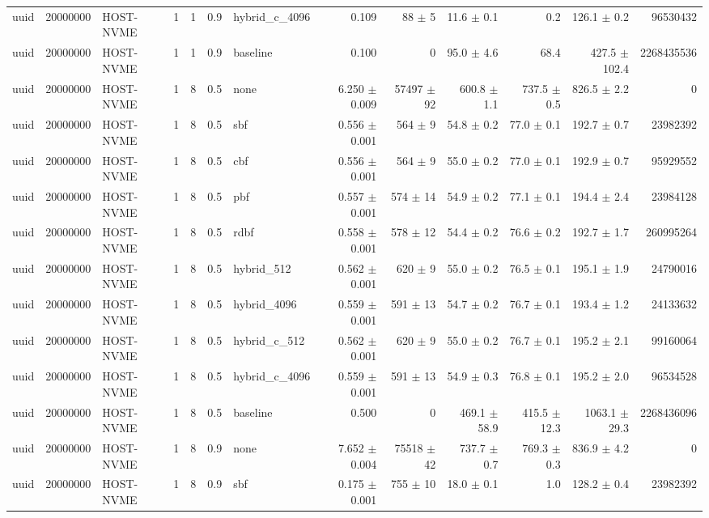 \begin{tabular}{lllllllrrrrrr}
uuid & 20000000 & HOST-NVME & 1 & 1 & 0.9 & hybrid\_c\_4096 & 0.109 & 88 $\pm$ 5 & 11.6 $\pm$ 0.1 & 0.2 & 126.1 $\pm$ 0.2 & 96530432 \\
uuid & 20000000 & HOST-NVME & 1 & 1 & 0.9 & baseline & 0.100 & 0 & 95.0 $\pm$ 4.6 & 68.4 & 427.5 $\pm$ 102.4 & 2268435536 \\
uuid & 20000000 & HOST-NVME & 1 & 8 & 0.5 & none & 6.250 $\pm$ 0.009 & 57497 $\pm$ 92 & 600.8 $\pm$ 1.1 & 737.5 $\pm$ 0.5 & 826.5 $\pm$ 2.2 & 0 \\
uuid & 20000000 & HOST-NVME & 1 & 8 & 0.5 & sbf & 0.556 $\pm$ 0.001 & 564 $\pm$ 9 & 54.8 $\pm$ 0.2 & 77.0 $\pm$ 0.1 & 192.7 $\pm$ 0.7 & 23982392 \\
uuid & 20000000 & HOST-NVME & 1 & 8 & 0.5 & cbf & 0.556 $\pm$ 0.001 & 564 $\pm$ 9 & 55.0 $\pm$ 0.2 & 77.0 $\pm$ 0.1 & 192.9 $\pm$ 0.7 & 95929552 \\
uuid & 20000000 & HOST-NVME & 1 & 8 & 0.5 & pbf & 0.557 $\pm$ 0.001 & 574 $\pm$ 14 & 54.9 $\pm$ 0.2 & 77.1 $\pm$ 0.1 & 194.4 $\pm$ 2.4 & 23984128 \\
uuid & 20000000 & HOST-NVME & 1 & 8 & 0.5 & rdbf & 0.558 $\pm$ 0.001 & 578 $\pm$ 12 & 54.4 $\pm$ 0.2 & 76.6 $\pm$ 0.2 & 192.7 $\pm$ 1.7 & 260995264 \\
uuid & 20000000 & HOST-NVME & 1 & 8 & 0.5 & hybrid\_512 & 0.562 $\pm$ 0.001 & 620 $\pm$ 9 & 55.0 $\pm$ 0.2 & 76.5 $\pm$ 0.1 & 195.1 $\pm$ 1.9 & 24790016 \\
uuid & 20000000 & HOST-NVME & 1 & 8 & 0.5 & hybrid\_4096 & 0.559 $\pm$ 0.001 & 591 $\pm$ 13 & 54.7 $\pm$ 0.2 & 76.7 $\pm$ 0.1 & 193.4 $\pm$ 1.2 & 24133632 \\
uuid & 20000000 & HOST-NVME & 1 & 8 & 0.5 & hybrid\_c\_512 & 0.562 $\pm$ 0.001 & 620 $\pm$ 9 & 55.0 $\pm$ 0.2 & 76.7 $\pm$ 0.1 & 195.2 $\pm$ 2.1 & 99160064 \\
uuid & 20000000 & HOST-NVME & 1 & 8 & 0.5 & hybrid\_c\_4096 & 0.559 $\pm$ 0.001 & 591 $\pm$ 13 & 54.9 $\pm$ 0.3 & 76.8 $\pm$ 0.1 & 195.2 $\pm$ 2.0 & 96534528 \\
uuid & 20000000 & HOST-NVME & 1 & 8 & 0.5 & baseline & 0.500 & 0 & 469.1 $\pm$ 58.9 & 415.5 $\pm$ 12.3 & 1063.1 $\pm$ 29.3 & 2268436096 \\
uuid & 20000000 & HOST-NVME & 1 & 8 & 0.9 & none & 7.652 $\pm$ 0.004 & 75518 $\pm$ 42 & 737.7 $\pm$ 0.7 & 769.3 $\pm$ 0.3 & 836.9 $\pm$ 4.2 & 0 \\
uuid & 20000000 & HOST-NVME & 1 & 8 & 0.9 & sbf & 0.175 $\pm$ 0.001 & 755 $\pm$ 10 & 18.0 $\pm$ 0.1 & 1.0 & 128.2 $\pm$ 0.4 & 23982392 \\

\end{tabular}
